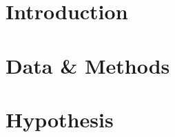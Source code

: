 \documentclass{article}
\begin{document}
\section{Introduction}


\section{Data \& Methods}


\section{Hypothesis}
\end{document}
